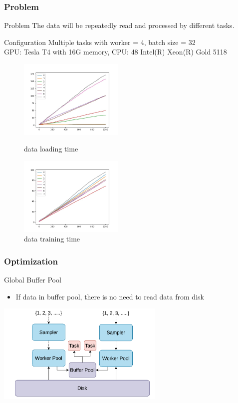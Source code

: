 \documentclass[notheorems, aspectratio=54]{beamer}
\begin{document}
\begin{frame}
    \frametitle{Problem}
    \begin{block}{Problem}
        The data will be repeatedly read and processed by different tasks.
    \end{block}
    \begin{block}{Configuration}
        Multiple tasks with worker = 4, batch size = 32 \\
        GPU: Tesla T4 with 16G memory, CPU: 48 Intel(R) Xeon(R) Gold 5118\\
    \end{block}
    \begin{figure}[htbp]
    \centering
    \begin{minipage}[t]{0.48\textwidth}
    \centering
    \includegraphics[width=5cm]{global_img_dir/l.jpg}
    \caption{data loading time}
    \end{minipage}
    \begin{minipage}[t]{0.48\textwidth}
    \centering
    \includegraphics[width=5cm]{global_img_dir/b.jpg}
    \caption{data training time}
    \end{minipage}
    \end{figure}
\end{frame}

\begin{frame}
    \frametitle{Optimization}
    \begin{block}{Global Buffer Pool}
        \begin{itemize}
            \item If data in buffer pool, there is no need to read data from disk
        \end{itemize}
    \end{block}
    \centering
    \includegraphics[width=8cm]{global_img_dir/global_buffer.png}
\end{frame}
\end{document}
